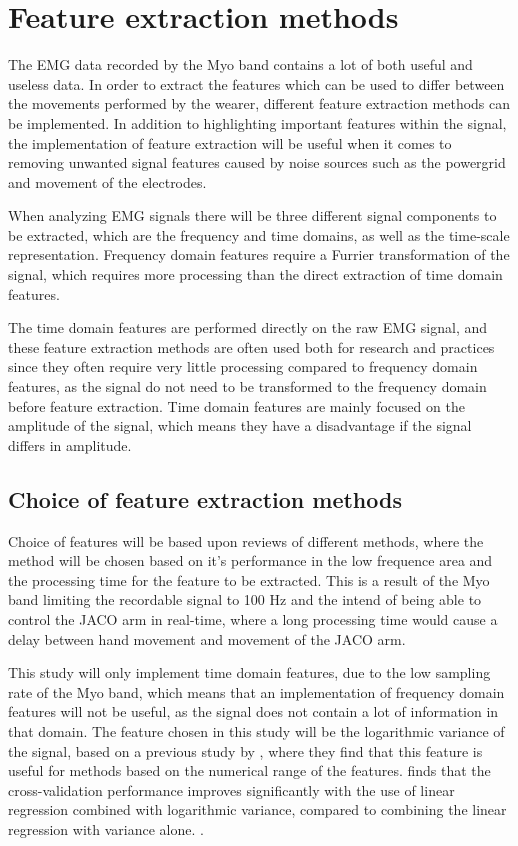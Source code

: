 \section{Feature extraction methods}


The EMG data recorded by the Myo band contains a lot of both useful and useless data. In order to extract the features which can be used to differ between the movements performed by the wearer, different feature extraction methods can be implemented. In addition to highlighting important features within the signal, the implementation of feature extraction will be useful when it comes to removing unwanted signal features caused by noise sources such as the powergrid and movement of the electrodes. \cite{phiny2012}

When analyzing EMG signals there will be three different signal components to be extracted, which are the frequency and time domains, as well as the time-scale representation. Frequency domain features require a Furrier transformation of the signal, which requires more processing than the direct extraction of time domain features. \cite{phiny2012}

The time domain features are performed directly on the raw EMG signal, and these feature extraction methods are often used both for research and practices since they often require very little processing compared to frequency domain features, as the signal do not need to be transformed to the frequency domain before feature extraction. Time domain features are mainly focused on the amplitude of the signal, which means they have a disadvantage if the signal differs in amplitude. \cite{phiny2012}

\subsection{Choice of feature extraction methods}

Choice of features will be based upon reviews of different methods, where the method will be chosen based on it's performance in the low frequence area and the processing time for the feature to be extracted. This is a result of the Myo band limiting the recordable signal to 100 Hz and the intend of being able to control the JACO arm in real-time, where a long processing time would cause a delay between hand movement and movement of the JACO arm.

This study will only implement time domain features, due to the low sampling rate of the Myo band, which means that an implementation of frequency domain features will not be useful, as the signal does not contain a lot of information in that domain. The feature chosen in this study will be the logarithmic variance of the signal, based on a previous study by \cite{hahne2014}, where they find that this feature is useful for methods based on the numerical range of the features. \cite{hahne2014} finds that the cross-validation performance improves significantly with the use of linear regression combined with logarithmic variance, compared to combining the linear regression with variance alone. \cite{hahne2014}.